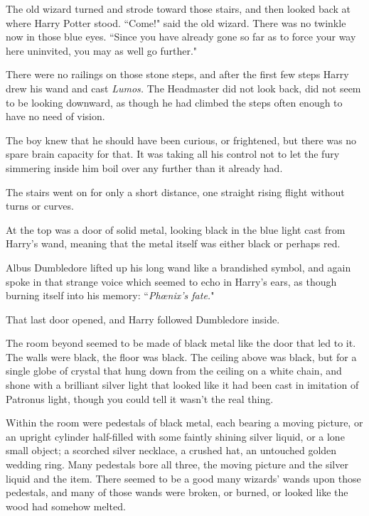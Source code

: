 The old wizard turned and strode toward those stairs, and then looked back at where Harry Potter stood. ``Come!" said the old wizard. There was no twinkle now in those blue eyes. ``Since you have already gone so far as to force your way here uninvited, you may as well go further."

\later

There were no railings on those stone steps, and after the first few steps Harry drew his wand and cast \emph{Lumos.} The Headmaster did not look back, did not seem to be looking downward, as though he had climbed the steps often enough to have no need of vision.

The boy knew that he should have been curious, or frightened, but there was no spare brain capacity for that. It was taking all his control not to let the fury simmering inside him boil over any further than it already had.

The stairs went on for only a short distance, one straight rising flight without turns or curves.

At the top was a door of solid metal, looking black in the blue light cast from Harry's wand, meaning that the metal itself was either black or perhaps red.

Albus Dumbledore lifted up his long wand like a brandished symbol, and again spoke in that strange voice which seemed to echo in Harry's ears, as though burning itself into his memory: ``\emph{Phœnix's fate.}"

That last door opened, and Harry followed Dumbledore inside.

The room beyond seemed to be made of black metal like the door that led to it. The walls were black, the floor was black. The ceiling above was black, but for a single globe of crystal that hung down from the ceiling on a white chain, and shone with a brilliant silver light that looked like it had been cast in imitation of Patronus light, though you could tell it wasn't the real thing.

Within the room were pedestals of black metal, each bearing a moving picture, or an upright cylinder half-filled with some faintly shining silver liquid, or a lone small object; a scorched silver necklace, a crushed hat, an untouched golden wedding ring. Many pedestals bore all three, the moving picture and the silver liquid and the item. There seemed to be a good many wizards' wands upon those pedestals, and many of those wands were broken, or burned, or looked like the wood had somehow melted.

